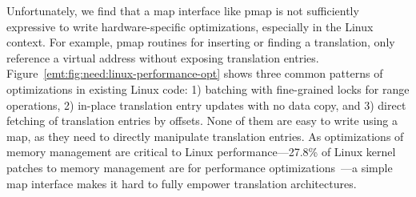 Unfortunately, we find that a map interface like pmap is not
	sufficiently expressive to write hardware-specific optimizations,
	especially in the Linux context. %
For example, pmap routines %
	for inserting or finding a translation, 
	only reference a virtual address without exposing
	translation entries.
Figure~\ref{emt:fig:need:linux-performance-opt} shows three common patterns of optimizations in existing Linux code:
	1) batching with fine-grained locks for range operations,
	2) in-place translation entry updates with no data copy,
	and 3) direct fetching of translation entries by offsets. 
None of them are easy to write using a map,
	as they need to directly manipulate translation entries.
As optimizations of memory management are critical to Linux performance---27.8\%
	of Linux kernel patches to memory management are for performance optimizations~\cite{huang16mmstudy}---a
	simple map interface makes it hard to fully empower translation architectures.
	



